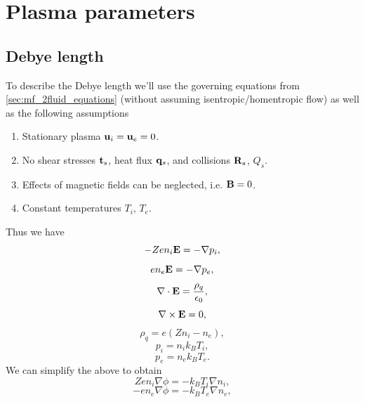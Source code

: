 \documentclass[a4paper,11pt]{report}
\begin{document}
\section{Plasma parameters}

\subsection{Debye length}
To describe the Debye length we'll use the governing equations from \cref{sec:mf_2fluid_equations} (without assuming isentropic/homentropic flow) as well as the following assumptions
\begin{enumerate}
    \item Stationary plasma $\mathbf{u}_i = \mathbf{u}_e = 0$.
    \item No shear stresses $\mathbf{t}_s$, heat flux $\mathbf{q}_s$, and collisions $\mathbf{R}_s$, $Q_s$.
    \item Effects of magnetic fields can be neglected, i.e. $\mathbf{B}=0$.
    \item Constant temperatures $T_i$, $T_e$.
\end{enumerate}
Thus we have
\begin{equation*}
    -Zen_i\mathbf{E} = -\nabla p_i,
\end{equation*}
\begin{equation*}
    en_e\mathbf{E} = -\nabla p_e,
\end{equation*}
\begin{equation*}
    \nabla \cdot \mathbf{E} = \frac{\rho_q}{\epsilon_0},
\end{equation*}
\begin{equation*}
    \nabla \times \mathbf{E} = 0,
\end{equation*}
\begin{equation*}
    \rho_q = e(Zn_i - n_e),
\end{equation*}
\begin{equation*}
    p_i = n_i k_B T_i,
\end{equation*}
\begin{equation*}
    p_e = n_e k_B T_e.
\end{equation*}
We can simplify the above to obtain
\begin{equation*}
    Zen_i \nabla \phi = -k_B T_i \nabla n_i,
\end{equation*}
\begin{equation*}
    -en_e \nabla \phi = -k_B T_e \nabla n_e,
\end{equation*}
\end{document}
